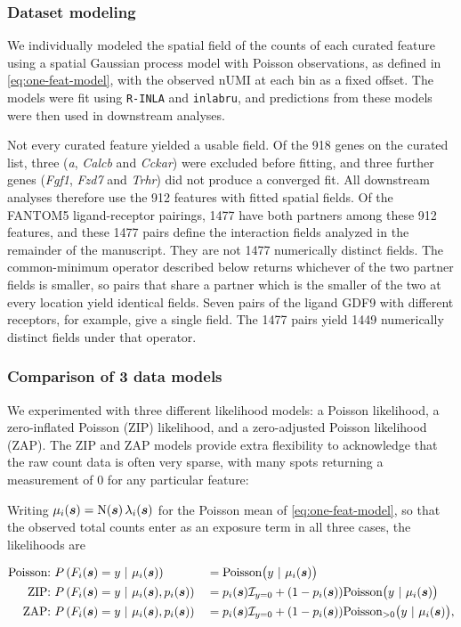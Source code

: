 \documentclass[10pt,letterpaper]{article}
\begin{document}
\subsubsection*{Dataset modeling}\label{sec:meth-models}

We individually modeled the spatial field of the counts of each curated feature using a spatial Gaussian process model with Poisson observations, as defined in \eqref{eq:one-feat-model}, with the observed nUMI at each bin as a fixed offset. The models were fit using \texttt{R-INLA} and \texttt{inlabru}, and predictions from these models were then used in downstream analyses.

Not every curated feature yielded a usable field. Of the 918 genes on the curated list, three (\textit{a}, \textit{Calcb} and \textit{Cckar}) were excluded before fitting, and three further genes (\textit{Fgf1}, \textit{Fzd7} and \textit{Trhr}) did not produce a converged fit. All downstream analyses therefore use the 912 features with fitted spatial fields. Of the FANTOM5 ligand-receptor pairings, 1477 have both partners among these 912 features, and these 1477 pairs define the interaction fields analyzed in the remainder of the manuscript. They are not 1477 numerically distinct fields. The common-minimum operator described below returns whichever of the two partner fields is smaller, so pairs that share a partner which is the smaller of the two at every location yield identical fields. Seven pairs of the ligand GDF9 with different receptors, for example, give a single field. The 1477 pairs yield 1449 numerically distinct fields under that operator.

\subsubsection*{Comparison of 3 data models}\label{sec:meth-model-comp}

We experimented with three different likelihood models: a Poisson likelihood, a zero-inflated Poisson (ZIP) likelihood, and a zero-adjusted Poisson likelihood (ZAP). The ZIP and ZAP models provide extra flexibility to acknowledge that the raw count data is often very sparse, with many spots returning a measurement of 0 for any particular feature:

Writing $\mu_i(\mbox{\boldmath $s$}) = \mbox{N}(\mbox{\boldmath $s$})\,\lambda_i(\mbox{\boldmath $s$})$ for the Poisson mean of \eqref{eq:one-feat-model}, so that the observed total counts enter as an exposure term in all three cases, the likelihoods are

\begin{equation}\label{eq:three-lik}
\begin{aligned}
    \mbox{Poisson:}\  &P\left(F_i(\mbox{\boldmath $s$})=y\ |\ \mu_i(\mbox{\boldmath $s$})\right) &&= \mbox{Poisson}\big(y\ |\ \mu_i(\mbox{\boldmath $s$})\big)\\
    \mbox{ZIP:}\  &P\left(F_i(\mbox{\boldmath $s$}) = y\ |\ \mu_i(\mbox{\boldmath $s$}), p_i(\mbox{\boldmath $s$})\right) &&= p_i(\mbox{\boldmath $s$})\mathcal{I}_{y=0}  + (1-p_i(\mbox{\boldmath $s$}))\mbox{Poisson}\big(y\ |\  \mu_i(\mbox{\boldmath $s$})\big) \\
    \mbox{ZAP:}\  &P\left(F_i(\mbox{\boldmath $s$})= y\ |\ \mu_i(\mbox{\boldmath $s$}), p_i(\mbox{\boldmath $s$})\right) &&= p_i(\mbox{\boldmath $s$})\mathcal{I}_{y=0}  + (1-p_i(\mbox{\boldmath $s$})) \mbox{Poisson}_{>0}\big(y\ |\  \mu_i(\mbox{\boldmath $s$})\big),
\end{aligned}
\end{equation}
\end{document}
